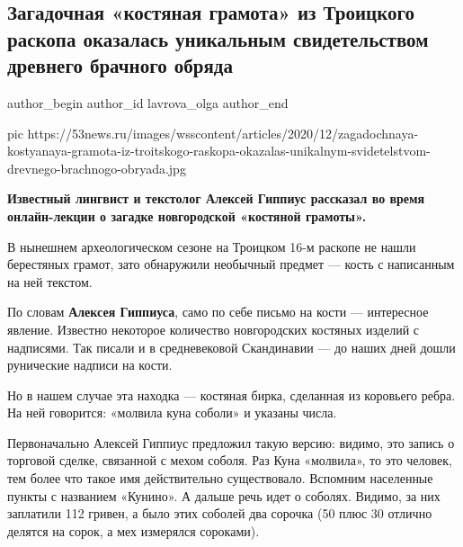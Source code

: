  
 
 
 
 
 
\subsection{Загадочная «костяная грамота» из Троицкого раскопа оказалась уникальным свидетельством древнего брачного обряда}
\label{sec:08_12_2020.news.ru.53news.lavrova_olga.1.troickii_raskop_arheologia}
\ifcmt
	author_begin
   author_id lavrova_olga
	author_end
\fi

\ifcmt
pic https://53news.ru/images/wsscontent/articles/2020/12/zagadochnaya-kostyanaya-gramota-iz-troitskogo-raskopa-okazalas-unikalnym-svidetelstvom-drevnego-brachnogo-obryada.jpg
\fi

{\bfseries 
Известный лингвист и текстолог Алексей Гиппиус рассказал во время онлайн-лекции о загадке новгородской «костяной грамоты».
}

В нынешнем археологическом сезоне на Троицком 16-м раскопе не нашли берестяных
грамот, зато обнаружили необычный предмет — кость с написанным на ней текстом.

По словам \textbf{Алексея Гиппиуса}, само по себе письмо на кости — интересное явление.
Известно некоторое количество новгородских костяных изделий с надписями. Так
писали и в средневековой Скандинавии — до наших дней дошли рунические надписи
на кости.

Но в нашем случае эта находка — костяная бирка, сделанная из коровьего ребра.
На ней говорится: «молвила куна соболи» и указаны числа.

Первоначально Алексей Гиппиус предложил такую версию: видимо, это запись о
торговой сделке, связанной с мехом соболя. Раз Куна «молвила», то это человек,
тем более что такое имя действительно существовало. Вспомним населенные пункты
с названием «Кунино». А дальше речь идет о соболях. Видимо, за них заплатили
112 гривен, а было этих соболей два сорочка (50 плюс 30 отлично делятся на
сорок, а мех измерялся сороками).

